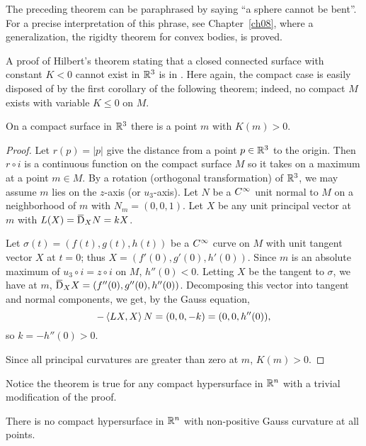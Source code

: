 \documentclass[../main]{subfiles}
\begin{document}
The preceding theorem can be paraphrased by saying ``a sphere cannot be bent''. For a precise interpretation of this phrase, see Chapter~\ref{ch08}, where a generalization, the rigidty theorem for convex bodies, is proved.

A proof of Hilbert's theorem stating that a closed connected surface with constant $K < 0$ cannot exist in $\mathbb{R}^3$ is in \cite{willmore1959introduction}. Here again, the compact case is easily disposed of by the first corollary of the following theorem; indeed, no compact $M$ exists with variable $K \le 0$ on $M$. 



\begin{theorem} \label{thm:ch3.2.3}
On a compact surface in $\mathbb{R}^3$ there is a point $m$ with $K(m) > 0$.
\end{theorem}

\begin{proof}
Let $r(p) = |p|$ give the distance from a point $p \in \mathbb{R}^3$ to the origin. Then $r \circ i$ is a continuous function on the compact surface $M$ so it takes on a maximum at a point $m \in M$. By a rotation (orthogonal transformation) of $\mathbb{R}^3$, we may assume $m$ lies on the $z$-axis (or $u_3$-axis). Let $N$ be a $C^\infty$ unit normal to $M$ on a neighborhood of $m$ with $N_m = (0, 0, 1)$. Let $X$ be any unit principal vector at $m$ with $L(X) = \covariant_X N = k X$.

Let $\sigma(t) = (f(t), g(t), h(t))$ be a $C^\infty$ curve on $M$ with unit tangent vector $X$ at $t = 0$; thus $X = (f'(0), g'(0), h'(0))$. Since $m$ is an absolute maximum of $u_3 \circ i = z \circ i$ on $M$, $h''(0) < 0$. Letting $X$ be the tangent to $\sigma$, we have at $m$, $\covariant_X X = (f''(0), g''(0), h''(0))$. Decomposing this vector into tangent and normal components, we get, by the Gauss equation, \[-\left\langle L X,X\right\rangle N = (0,0, -k) = (0,0,h''(0)),\] so $k = -h''(0) > 0$.

Since all principal curvatures are greater than zero at $m$, $K(m) > 0$.
\end{proof}



Notice the theorem is true for any compact hypersurface in $\mathbb{R}^n$ with a trivial modification of the proof.



\begin{corollary} \label{cor:ch3.2.4}
There is no compact hypersurface in $\mathbb{R}^n$ with non-positive Gauss curvature at all points.
\end{corollary}
\end{document}
